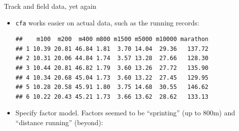 \begin{frame}[fragile]{Track and field data, yet again}
  
  \begin{itemize}
  \item \texttt{cfa} works easier on actual data, such as the running records:
{\small 

\begin{knitrout}
\color{fgcolor}\begin{kframe}
\begin{alltt}
\hlstd{(track[,}\hlopt{-}\hlstd{])}
\end{alltt}
\begin{verbatim}
##    m100  m200  m400 m800 m1500 m5000 m10000 marathon
## 1 10.39 20.81 46.84 1.81  3.70 14.04  29.36   137.72
## 2 10.31 20.06 44.84 1.74  3.57 13.28  27.66   128.30
## 3 10.44 20.81 46.82 1.79  3.60 13.26  27.72   135.90
## 4 10.34 20.68 45.04 1.73  3.60 13.22  27.45   129.95
## 5 10.28 20.58 45.91 1.80  3.75 14.68  30.55   146.62
## 6 10.22 20.43 45.21 1.73  3.66 13.62  28.62   133.13
\end{verbatim}
\end{kframe}
\end{knitrout}
}

\item Specify factor model. Factors seemed to be ``sprinting'' (up to
  800m) and ``distance running'' (beyond):
  

\begin{knitrout}
\color{fgcolor}\begin{kframe}
\begin{alltt}
\hlkwb{=}
\end{alltt}
\end{kframe}
\end{knitrout}
  
  
    
  \end{itemize}
  
\end{frame}


